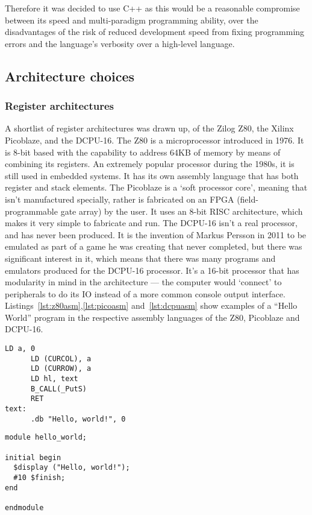 Therefore it was decided to use C++ as this would be a reasonable compromise
between its speed and multi-paradigm programming ability, over the disadvantages
of the risk of reduced development speed from fixing programming errors and the
language's verbosity over a high-level language.

\subsection{Architecture choices}

\subsubsection{Register architectures}
A shortlist of register architectures was drawn up, of the Zilog Z80, the Xilinx
Picoblaze, and the DCPU-16. The Z80 is a microprocessor introduced in 1976. It
is 8-bit based with the capability to address 64KB of memory by means of
combining its registers. An extremely popular processor during the 1980s, it is
still used in embedded systems. It has its own assembly
language that has both register and stack elements. The Picoblaze is a `soft
processor core', meaning that isn't manufactured specially, rather is fabricated
on an FPGA (field-programmable gate array) by the user. It uses an 8-bit RISC
architecture, which makes it very simple to fabricate and run. The DCPU-16 isn't
a real processor, and has never been produced. It is the invention of
Markus Persson in 2011 to be emulated as part of a game he was creating that
never completed, but there was significant interest in it, which means that
there was many programs and emulators produced for the DCPU-16 processor.
It's a 16-bit processor that has modularity in mind in the architecture --- the
computer would `connect' to peripherals to do its IO instead of a more common
console output interface. Listings~\ref{lst:z80asm},\ref{lst:picoasm}
and~\ref{lst:dcpuasm} show examples of a ``Hello World'' program in the
respective assembly languages of the Z80, Picoblaze and DCPU-16.

\noindent\begin{minipage}{0.5\textwidth}
\begin{lstlisting}[caption={Z80 ASM},label={lst:z80asm}]
      LD a, 0
      LD (CURCOL), a
      LD (CURROW), a
      LD hl, text
      B_CALL(_PutS)
      RET
text:
      .db "Hello, world!", 0
\end{lstlisting}%
\end{minipage}%
\noindent\begin{minipage}{0.5\textwidth}
\begin{lstlisting}[caption={Picoblaze ASM},label={lst:picoasm}]
module hello_world;

initial begin
  $display ("Hello, world!");
  #10 $finish;
end

endmodule
\end{lstlisting}%
\end{minipage}

